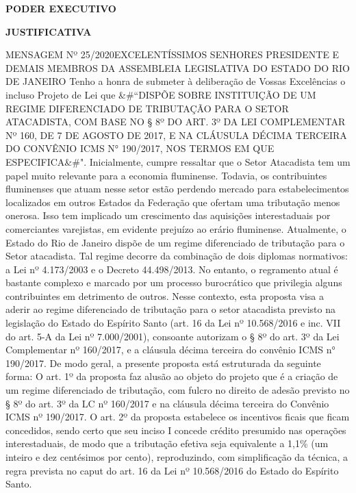 \documentclass[10pt]{article}
\begin{document}
\begin{center}
  

   \bigskip

  \textbf{  PODER EXECUTIVO}

  \bigskip

  \textbf{JUSTIFICATIVA}
  \bigskip

\end{center}

  MENSAGEM Nº 25/2020EXCELENTÍSSIMOS SENHORES PRESIDENTE E DEMAIS MEMBROS DA ASSEMBLEIA LEGISLATIVA DO ESTADO DO RIO DE JANEIRO
Tenho a honra de submeter à deliberação de Vossas Excelências o incluso Projeto de Lei que &#``DISPÕE SOBRE INSTITUIÇÃO DE UM REGIME DIFERENCIADO DE TRIBUTAÇÃO PARA O SETOR ATACADISTA, COM BASE NO § 8º DO ART. 3º DA LEI COMPLEMENTAR Nº 160, DE 7 DE AGOSTO DE 2017, E NA CLÁUSULA DÉCIMA TERCEIRA DO CONVÊNIO ICMS N° 190/2017, NOS TERMOS EM QUE ESPECIFICA&#". 
Inicialmente, cumpre ressaltar que o Setor Atacadista tem um papel muito relevante para a economia fluminense. Todavia, os contribuintes fluminenses que atuam nesse setor estão perdendo mercado para estabelecimentos localizados em outros Estados da Federação que ofertam uma tributação menos onerosa. Isso tem implicado um crescimento das aquisições interestaduais por comerciantes varejistas, em evidente prejuízo ao erário fluminense.
Atualmente, o Estado do Rio de Janeiro dispõe de um regime diferenciado de tributação para o Setor atacadista. Tal regime decorre da combinação de dois diplomas normativos: a Lei nº 4.173/2003 e o Decreto 44.498/2013. No entanto, o regramento atual é bastante complexo e marcado por um processo burocrático que privilegia alguns contribuintes em detrimento de outros. 
Nesse contexto, esta proposta visa a aderir ao regime diferenciado de tributação para o setor atacadista previsto na legislação do Estado do Espírito Santo (art. 16 da Lei nº 10.568/2016 e inc. VII do art. 5-A da Lei nº 7.000/2001), consoante autorizam o § 8º do art. 3º da Lei Complementar nº 160/2017, e a cláusula décima terceira do convênio ICMS n° 190/2017.
De modo geral, a presente proposta está estruturada da seguinte forma:
O art. 1º da proposta faz alusão ao objeto do projeto que é a criação de um regime diferenciado de tributação, com fulcro no direito de adesão previsto no § 8º do art. 3º da LC nº 160/2017 e na cláusula décima terceira do Convênio ICMS nº 190/2017.
O art. 2º da proposta estabelece os incentivos ficais que ficam concedidos, sendo certo que seu inciso I concede crédito presumido nas operações interestaduais, de modo que a tributação efetiva seja equivalente a 1,1\% (um inteiro e dez centésimos por cento), reproduzindo, com simplificação da técnica, a regra prevista no caput do art. 16 da Lei nº 10.568/2016 do Estado do Espírito Santo. 
\end{document}
